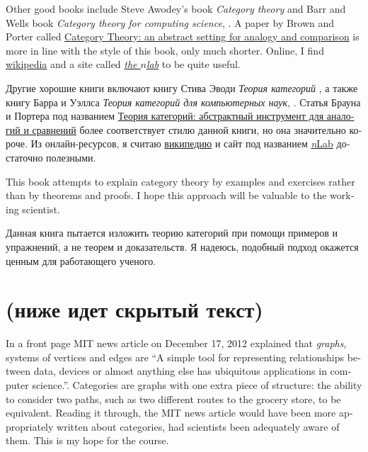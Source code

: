 \documentclass[a4paper]{book}
\theoremstyle{myth}
\begin{document}
\begin{english}
Other good books include Steve Awodey's book {\em Category theory} \cite{Awo} and Barr and Wells book {\em Category theory for computing science}, \cite{BW}.  A paper by Brown and Porter called  \href{http://pages.bangor.ac.uk/\%7Emas010/pdffiles/Analogy-and-Comparison.pdf}{\text Category Theory: an abstract setting for analogy and comparison} \cite{BP1} is more in line with the style of this book, only much shorter. Online, I find \href{http://www.wikipedia.org}{\text wikipedia} and a site called \href{http://ncatlab.org/nlab/show/HomePage}{\em the $n$lab} to be quite useful.

\begin{russian}Другие хорошие книги включают книгу Стива Эводи {\em Теория категорий} \cite{Awo}, а также книгу Барра и Уэллса {\em Теория категорий для компьютерных наук}, \cite{BW}. Статья Брауна и Портера под названием  \href{http://pages.bangor.ac.uk/\%7Emas010/pdffiles/Analogy-and-Comparison.pdf}{\text Теория категорий: абстрактный инструмент для аналогий и сравнений} \cite{BP1} более соответствует стилю данной книги, но она значительно короче. Из онлайн-ресурсов, я считаю \href{http://www.wikipedia.org}{\text википедию} и сайт под названием \href{http://ncatlab.org/nlab/show/HomePage}{{\em{n}}Lab} достаточно полезными. \end{russian}

This book attempts to explain category theory by examples and exercises rather than by theorems and proofs. I hope this approach will be valuable to the working scientist.

\begin{russian}Данная книга пытается изложить теорию категорий при помощи примеров и упражнений, а не теорем и доказательств. Я надеюсь, подобный подход окажется ценным для работающего ученого. \end{russian}


\section{(ниже идет скрытый текст)}

In a front page MIT news article on December 17, 2012 explained that {\em graphs}, systems of vertices and edges are “A simple tool for representing relationships between data, devices or almost anything else has ubiquitous applications in computer science.”\cite{http://web.mit.edu/newsoffice/2012/explained-graphs-computer-science-1217.html}. Categories are graphs with one extra piece of structure: the ability to consider two paths, such as two different routes to the grocery store, to be equivalent. Reading it through, the MIT news article would have been more appropriately written about categories, had scientists been adequately aware of them. This is my hope for the course.


\end{english}
\end{document}
